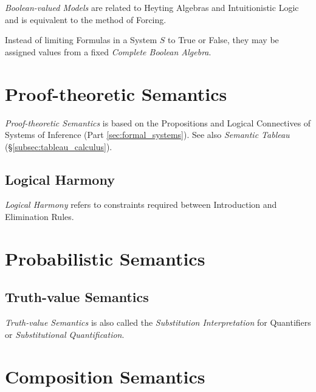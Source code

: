 \documentclass{article}
\begin{document}
\emph{Boolean-valued Models} are related to Heyting Algebras and
Intuitionistic Logic and is equivalent to the method of Forcing.

Instead of limiting Formulas in a System $S$ to True or False, they
may be assigned values from a fixed \emph{Complete Boolean Algebra}.

\section{Proof-theoretic Semantics}

\emph{Proof-theoretic Semantics} is based on the Propositions and
Logical Connectives of Systems of Inference (Part
\ref{sec:formal_systems}). See also \emph{Semantic Tableau}
(\S\ref{subsec:tableau_calculus}).

\subsection{Logical Harmony} \label{subsec:logical_harmony}

\emph{Logical Harmony} refers to constraints required between
Introduction and Elimination Rules.

\section{Probabilistic Semantics}

\subsection{Truth-value Semantics}

\emph{Truth-value Semantics} is also called the \emph{Substitution
  Interpretation} for Quantifiers or \emph{Substitutional
  Quantification}.

\section{Composition Semantics}
\end{document}
